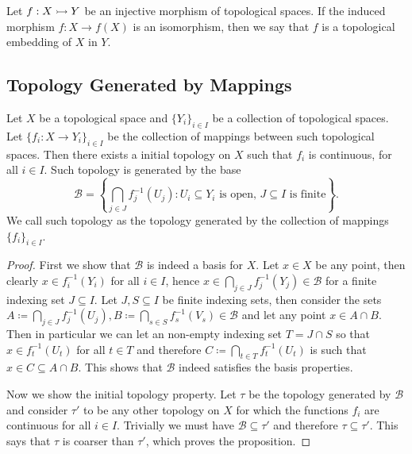 \begin{definition}[Embedding]\label{def:top-embedding}
Let \(f: X \rightarrowtail Y\) be an injective morphism of topological spaces. If the
induced morphism \(f: X \to f(X)\) is an isomorphism, then we say that \(f\) is a
topological embedding of \(X\) in \(Y\).
\end{definition}

\subsection{Topology Generated by Mappings}

\begin{proposition}
\label{prop: top generated by collection of maps}
Let \(X\) be a topological space and \(\{Y_i\}_{i \in I}\) be a collection of
topological spaces. Let \(\{f_i : X \to Y_i\}_{i \in I}\) be the collection of
mappings between such topological spaces. Then there exists a initial
topology on \(X\) such that \(f_i\) is continuous, for all \(i \in I\). Such
topology is generated by the base
\[
  \mathcal B = \left\{ \bigcap_{j \in J} f_j^{-1}(U_j) : U_i \subseteq Y_i
  \text{ is open, } J \subseteq I \text{ is finite}\right\}.
\]
We call such topology as the topology generated by the collection of mappings
\(\{f_i\}_{i \in I}\).
\end{proposition}

\begin{proof}
First we show that \(\mathcal B\) is indeed a basis for \(X\). Let \(x \in X\)
be any point, then clearly \(x \in f_i^{-1}(Y_i)\) for all \(i \in I\), hence
\(x \in \bigcap_{j \in  J} f_j^{-1}(Y_j) \in \mathcal B\) for a finite
indexing set \(J \subseteq I\).
Let \(J, S \subseteq I\) be finite indexing sets, then consider the sets
\(A \coloneq \bigcap_{j \in J} f_j^{-1}(U_j), B \coloneq \bigcap_{s \in S} f_s^{-1}(V_s) \in
\mathcal B\) and let any point \(x \in A \cap B\). Then in particular we can
let an non-empty indexing set \(T = J \cap S\) so that \(x \in f_t^{-1}(U_t)\)
for all \(t \in T\) and therefore \(C \coloneq \bigcap_{t \in  T} f_t^{-1}(U_t)\) is
such that \(x \in C \subseteq A \cap B\). This shows that \(\mathcal B\)
indeed satisfies the basis properties.

Now we show the initial topology property. Let \(\tau\) be the topology
generated by \(\mathcal B\) and consider \(\tau'\) to be any other
topology on \(X\) for which the functions \(f_i\) are continuous for all \(i
\in I\). Trivially we must have \(\mathcal B \subseteq \tau'\) and
therefore \(\tau \subseteq \tau'\). This says that \(\tau\)
is coarser than \(\tau'\), which proves the proposition.
\end{proof}

